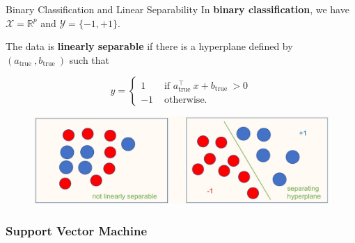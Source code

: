 \begin{frame}[allowframebreaks]

\begin{mydefinitionblock}{3.5}{Binary Classification and Linear Separability}
    In \textbf{binary classification}, we have $\mathcal{X}=\mathbb{R}^{p}$ and $\mathcal{Y}=\{-1,+1\}$.

    The data is \textbf{linearly separable} if there is a hyperplane defined by $(a_{\text {true }}, b_{\text {true }} )$ such that

    $$
    y=\left\{\begin{array}{cl}
    1 & \text { if } a_{\text {true }}^{\top} x+b_{\text {true }}>0 \\
    -1 & \text { otherwise. }
    \end{array}\right.
    $$

    \begin{figure}[H]
        \centering
        \includegraphics[width=1.0\textwidth]{.././assets/3.1.jpg}
    \end{figure}
\end{mydefinitionblock}

\end{frame}

\subsubsection{Support Vector Machine   }


